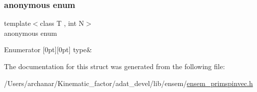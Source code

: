 \subsubsection{\texorpdfstring{anonymous enum}{anonymous enum}}
{\footnotesize\ttfamily template$<$class T , int N$>$ \\
anonymous enum}

\begin{DoxyEnumFields}{Enumerator}
[0pt][0pt]{}\mbox{\label{structENSEM_1_1EnsbcIO_3_01PSpinVector_3_01T_00_01N_01_4_01_4_a9dfe5a4ae811ba3afad18150e4dc7562a04e61fa5aa42066e9fedbcc4e35bc62d}} 
type&\\
\hline

\end{DoxyEnumFields}


The documentation for this struct was generated from the following file\+:\begin{DoxyCompactItemize}
\item 
/\+Users/archanar/\+Kinematic\+\_\+factor/adat\+\_\+devel/lib/ensem/\mbox{\hyperlink{lib_2ensem_2ensem__primspinvec_8h}{ensem\+\_\+primspinvec.\+h}}\end{DoxyCompactItemize}
